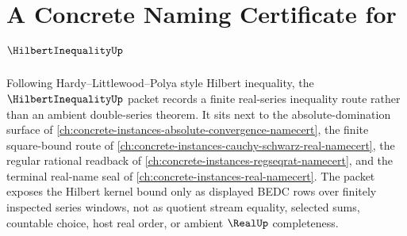 \chapter{A Concrete Naming Certificate for $\HilbertInequalityUp$}
\label{ch:concrete-instances-hilbert-inequality-namecert}

Following Hardy--Littlewood--Polya style Hilbert inequality, the $\HilbertInequalityUp$ packet records a finite real-series inequality route rather than an ambient double-series theorem. It sits next to the absolute-domination surface of \autoref{ch:concrete-instances-absolute-convergence-namecert}, the finite square-bound route of \autoref{ch:concrete-instances-cauchy-schwarz-real-namecert}, the regular rational readback of \autoref{ch:concrete-instances-regseqrat-namecert}, and the terminal real-name seal of \autoref{ch:concrete-instances-real-namecert}. The packet exposes the Hilbert kernel bound only as displayed BEDC rows over finitely inspected series windows, not as quotient stream equality, selected sums, countable choice, host real order, or ambient $\RealUp$ completeness.

